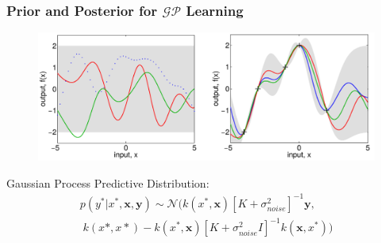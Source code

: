 \documentclass[10pt]{beamer}
\newcommand{\bx}{\mathbf{x}}
\newcommand{\by}{\mathbf{y}}
\newcommand{\gp}{\mathcal{GP}}
\newcommand{\gaussN}{\mathcal{N}}
\begin{document}
  \begin{frame}
    \frametitle{Prior and Posterior for $\gp$ Learning}

    \begin{figure}
      \centering
      \includegraphics[width=\textwidth]{gpRegression.png}
    \end{figure}

    Gaussian Process Predictive Distribution:
      \begin{equation*}
        \begin{array}{c}
          p(y^*|x^*,\bx,\by) \sim \gaussN ( k(x^*,\bx)[K + \sigma^2_{noise}]^{-1}\by, \\[0.2cm]
          \; k(x*,x*) - k(x^*,\bx)[K + \sigma^2_{noise}I]^{-1} k(\bx,x^*) )
        \end{array}
      \end{equation*}

  \end{frame}
\end{document}
